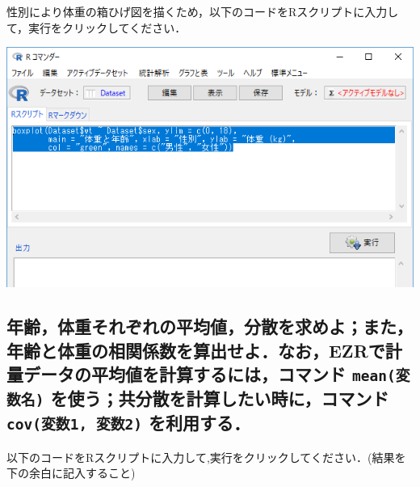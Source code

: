 \documentclass[11pt,]{problemset}
\newenvironment{Shaded}{\begin{snugshade}}{\end{snugshade}}
\newcommand{\KeywordTok}[1]{\textcolor[rgb]{0.13,0.29,0.53}{\textbf{#1}}}
\newcommand{\DataTypeTok}[1]{\textcolor[rgb]{0.13,0.29,0.53}{#1}}
\newcommand{\DecValTok}[1]{\textcolor[rgb]{0.00,0.00,0.81}{#1}}
\newcommand{\StringTok}[1]{\textcolor[rgb]{0.31,0.60,0.02}{#1}}
\newcommand{\OperatorTok}[1]{\textcolor[rgb]{0.81,0.36,0.00}{\textbf{#1}}}
\newcommand{\NormalTok}[1]{#1}
\begin{document}
\vfill

性別により体重の箱ひげ図を描くため，以下のコードをRスクリプトに入力して，実行をクリックしてください．

\begin{Shaded}
\end{Shaded}

\begin{center}\includegraphics[width=0.8\linewidth]{pic/box01} \end{center}

\subsection{\texorpdfstring{年齢，体重それぞれの平均値，分散を求めよ；また，年齢と体重の相関係数を算出せよ．なお，EZRで計量データの平均値を計算するには，コマンド
\texttt{mean(変数名)} を使う；共分散を計算したい時に，コマンド
\texttt{cov(変数1,\ 変数2)}
を利用する．}{年齢，体重それぞれの平均値，分散を求めよ；また，年齢と体重の相関係数を算出せよ．なお，EZRで計量データの平均値を計算するには，コマンド mean(変数名) を使う；共分散を計算したい時に，コマンド cov(変数1, 変数2) を利用する．}}\label{ezr-mean--cov1-2-}

以下のコードをRスクリプトに入力して,実行をクリックしてください．(結果を下の余白に記入すること)
\end{document}
